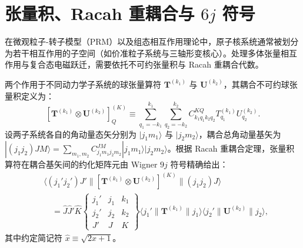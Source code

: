 \section{张量积、Racah 重耦合与 $6j$ 符号}\label{sec:appA-3}

在微观粒子-转子模型（PRM）以及组态相互作用理论中，原子核系统通常被划分为若干相互作用的子空间（如价准粒子系统与三轴形变核心）。处理多体张量相互作用与复合态电磁跃迁，需要依托不可约张量积与 Racah 重耦合代数。

两个作用于不同动力学子系统的球张量算符 $\mathbf{T}^{(k_1)}$ 与 $\mathbf{U}^{(k_2)}$，其耦合不可约球张量积定义为：
\begin{equation}\label{eq:appA-tensor-product-def}
[\mathbf{T}^{(k_1)} \otimes \mathbf{U}^{(k_2)}]_Q^{(K)} \equiv \sum_{q_1=-k_1}^{k_1} \sum_{q_2=-k_2}^{k_2} C_{k_1 q_1 k_2 q_2}^{K Q} T_{q_1}^{(k_1)} U_{q_2}^{(k_2)} .
\end{equation}
设两子系统各自的角动量态矢分别为 $|j_1 m_1\rangle$ 与 $|j_2 m_2\rangle$，耦合总角动量基矢为 $|(j_1 j_2) J M\rangle = \sum_{m_1, m_2} C_{j_1 m_1 j_2 m_2}^{J M} |j_1 m_1\rangle |j_2 m_2\rangle$。根据 Racah 重耦合定理，张量积算符在耦合基矢间的约化矩阵元由 Wigner $9j$ 符号精确给出：
\begin{equation}\label{eq:appA-9j-rme}
\begin{aligned}
&\langle (j_1' j_2') J' \| [\mathbf{T}^{(k_1)} \otimes \mathbf{U}^{(k_2)}]^{(K)} \| (j_1 j_2) J \rangle \\
&\quad = \hat{J} \hat{J}' \hat{K} \begin{Bmatrix} j_1' & j_1 & k_1 \\ j_2' & j_2 & k_2 \\ J' & J & K \end{Bmatrix} \langle j_1' \| \mathbf{T}^{(k_1)} \| j_1 \rangle \langle j_2' \| \mathbf{U}^{(k_2)} \| j_2 \rangle ,
\end{aligned}
\end{equation}
其中约定简记符 $\hat{x} \equiv \sqrt{2x + 1}$。

